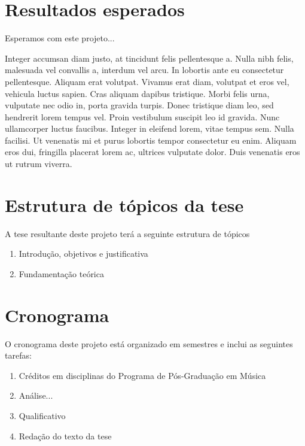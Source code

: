 \section{Resultados esperados}
\label{sec:resultados-esperados}

Esperamos com este projeto...

Integer accumsan diam justo, at tincidunt felis pellentesque a. Nulla
nibh felis, malesuada vel convallis a, interdum vel arcu. In lobortis
ante eu consectetur pellentesque. Aliquam erat volutpat. Vivamus erat
diam, volutpat et eros vel, vehicula luctus sapien. Cras aliquam
dapibus tristique. Morbi felis urna, vulputate nec odio in, porta
gravida turpis. Donec tristique diam leo, sed hendrerit lorem tempus
vel. Proin vestibulum suscipit leo id gravida. Nunc ullamcorper luctus
faucibus. Integer in eleifend lorem, vitae tempus sem. Nulla facilisi.
Ut venenatis mi et purus lobortis tempor consectetur eu enim. Aliquam
eros dui, fringilla placerat lorem ac, ultrices vulputate dolor. Duis
venenatis eros ut rutrum viverra.

\section{Estrutura de tópicos da tese}
\label{sec:estrutura-de-topicos}

A tese resultante deste projeto terá a seguinte estrutura de tópicos

\begin{enumerate}
\item Introdução, objetivos e justificativa
\item Fundamentação teórica
\end{enumerate}


\section{Cronograma}
\label{sec:cronograma}

O cronograma deste projeto está organizado em semestres e inclui as seguintes tarefas:

\begin{enumerate}
\item Créditos em disciplinas do Programa de Pós-Graduação em Música
\item Análise...
\item Qualificativo
\item Redação do texto da tese
\end{enumerate}



